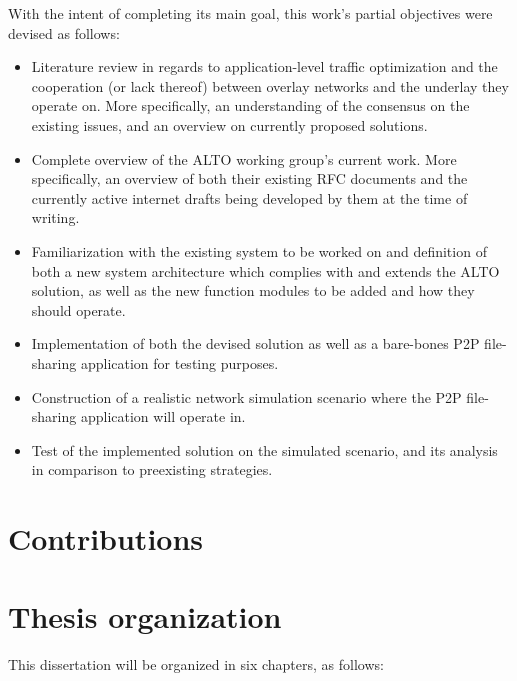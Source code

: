     With the intent of completing its main goal, this work's partial objectives were devised as follows:

\begin{itemize}
    \item Literature review in regards to application-level traffic optimization and the cooperation (or lack thereof) between overlay networks and the underlay they operate on.
        More specifically, an understanding of the consensus on the existing issues, and an overview on currently proposed solutions.
    \item Complete overview of the ALTO working group's current work.
        More specifically, an overview of both their existing RFC documents and the currently active internet drafts being developed by them at the time of writing.
    \item Familiarization with the existing system to be worked on and definition of both a new system architecture which complies with and extends the ALTO solution, as well as the new function modules to be added and how they should operate.
    \item Implementation of both the devised solution as well as a bare-bones P2P file-sharing application for testing purposes.
    \item Construction of a realistic network simulation scenario where the P2P file-sharing application will operate in.
    \item Test of the implemented solution on the simulated scenario, and its analysis in comparison to preexisting strategies.
\end{itemize}

\section{Contributions}


\section{Thesis organization}

    This dissertation will be organized in six chapters, as follows:

